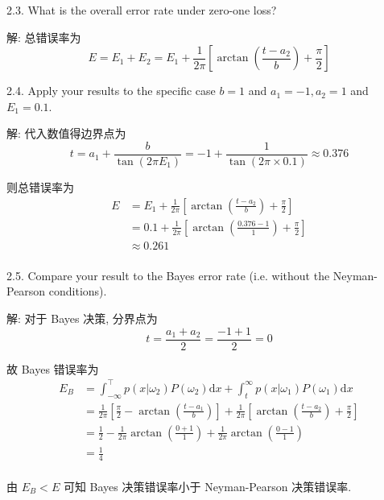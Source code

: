 \documentclass[openany]{ctexbook}
\theoremstyle{kaiti}
\theoremstyle{normal}
\begin{document}
2.3. What is the overall error rate under zero-one loss?

解: 总错误率为
\begin{equation}
  E=E_1+E_2=E_1+\frac{1}{2\pi}\left[\arctan\left(\frac{t-a_2}{b}\right)+\frac{\pi}{2}\right]
\end{equation}

2.4. Apply your results to the specific case $b=1$ and $a_{1}=-1, a_{2}=1$ and $E_{1}=0.1$.

解: 代入数值得边界点为
\begin{equation}
  t=a_1+\frac{b}{\tan(2\pi E_1)}=-1+\frac{1}{\tan(2\pi\times0.1)}\approx0.376
\end{equation}

则总错误率为
\begin{equation}
  \begin{aligned}
    E
    &=E_1+\frac{1}{2\pi}\left[\arctan\left(\frac{t-a_2}{b}\right)+\frac{\pi}{2}\right]\\
    &=0.1+\frac{1}{2\pi}\left[\arctan\left(\frac{0.376-1}{1}\right)+\frac{\pi}{2}\right]\\
    &\approx0.261\\
  \end{aligned}
\end{equation}

2.5. Compare your result to the Bayes error rate (i.e. without the Neyman-Pearson conditions).

解: 对于 Bayes 决策, 分界点为
\begin{equation}
  t=\frac{a_1+a_2}{2}=\frac{-1+1}{2}=0
\end{equation}

故 Bayes 错误率为
\begin{equation}
  \begin{aligned}
    E_B
    &=\int_{-\infty}^{\top} p(x|\omega_2)P(\omega_2)\mathrm{d}x+\int_t^\infty p(x|\omega_1)P(\omega_1)\mathrm{d}x\\
    &=\frac{1}{2\pi}\left[\frac{\pi}{2}-\arctan\left(\frac{t-a_1}{b}\right)\right]+\frac{1}{2\pi}\left[\arctan\left(\frac{t-a_2}{b}\right)+\frac{\pi}{2}\right]\\
    &=\frac{1}{2}-\frac{1}{2\pi}\arctan\left(\frac{0+1}{1}\right)+\frac{1}{2\pi}\arctan\left(\frac{0-1}{1}\right)\\
    &=\frac{1}{4}\\
  \end{aligned}
\end{equation}

由 $E_B<E$ 可知 Bayes 决策错误率小于 Neyman-Pearson 决策错误率.
\end{document}
